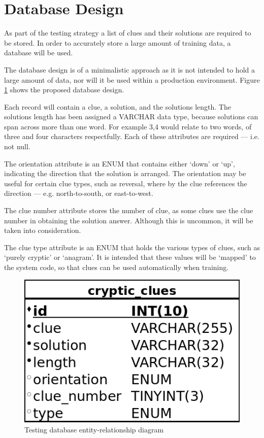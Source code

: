 \section{Database Design}
\label{sec:database_design}

As part of the testing strategy a list of clues and their solutions are required
to be stored. In order to accurately store a large amount of training data, a 
database will be used.

The database design is of a minimalistic approach as it is not intended to hold
a large amount of data, nor will it be used within a production environment. 
Figure \ref{fig:database_erd} shows the proposed database design.

Each record will contain a clue, a solution, and the solutions length. The
solutions length has been assigned a VARCHAR data type, because solutions can
span across more than one word. For example 3,4 would relate to two words, of
three and four characters respectfully. Each of these attributes are required 
--- i.e. not null.

The orientation attribute is an ENUM that contains either `down' or `up', 
indicating the direction that the solution is arranged. The orientation may be 
useful for certain clue types, such as reversal, where by the clue references 
the direction --- e.g. north-to-south, or east-to-west.

The clue number attribute stores the number of clue, as some clues use the clue 
number in obtaining the solution answer. Although this is uncommon, it will be 
taken into consideration.

The clue type attribute is an ENUM that holds the various types of clues, 
such as `purely cryptic' or `anagram'. It is intended that these values will be 
`mapped' to the system code, so that clues can be used automatically when 
training.

\begin{figure}[H]
  \centering
  \includegraphics[scale=0.5]{database/database.png}
  \caption{Testing database entity-relationship diagram}
  \label{fig:database_erd}
\end{figure}
